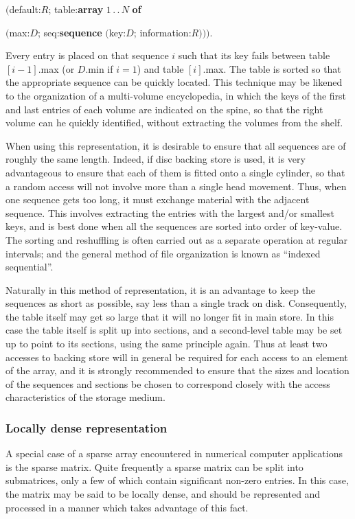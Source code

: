 \quad $($default:$R$; table:\textbf{array} $1\,.\,.\,N$ \textbf{of}

\tabto*{10em}$($max:$D$; seq:\textbf{sequence} $($key:$D$; information:$R)))$.

\noindent
Every entry is placed on that sequence $i$ such that its key fails between table $[i - 1]$.max (or $D$.min if $i = 1$) and table $[i]$.max. The table is sorted so that the appropriate sequence can be quickly located. This technique may be likened to the organization of a multi-volume encyclopedia, in which the keys of the first and last entries of each volume are indicated on the spine, so that the right volume can he quickly identified, without extracting the volumes from the shelf.

When using this representation, it is desirable to ensure that all sequences are of roughly the same length. Indeed, if disc backing store is used, it is very advantageous to ensure that each of them is fitted onto a single cylinder, so that a random access will not involve more than a single head movement. Thus, when one sequence gets too long, it must exchange material with the adjacent sequence. This involves extracting the entries with the largest and/or smallest keys, and is best done when all the sequences are sorted into order of key-value. The sorting and reshuffling is often carried out as a separate operation at regular intervals; and the general method of file organization is known as ``indexed sequential''.

Naturally in this method of representation, it is an advantage to keep the sequences as short as possible, say less than a single track on disk. Consequently, the table itself may get so large that it will no longer fit in main store. In this case the table itself is split up into sections, and a second-level table may be set up to point to its sections, using the same principle again. Thus at least two accesses to backing store will in general be required for each access to an element of the array, and it is strongly recommended to ensure that the sizes and location of the sequences and sections be chosen to correspond closely with the access characteristics of the storage medium.

\subsubsection{Locally dense representation}

A special case of a sparse array encountered in numerical computer applications is the sparse matrix. Quite frequently a sparse matrix can be split into submatrices, only a few of which contain significant non-zero entries. In this case, the matrix may be said to be locally dense, and should be represented and processed in a manner which takes advantage of this fact.

